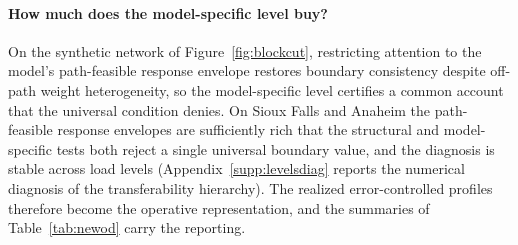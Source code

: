 \paragraph{How much does the model-specific level buy?}\label{sec:levelsdiag}
On the synthetic network of Figure~\ref{fig:blockcut}, restricting
attention to the model's path-feasible response envelope restores
boundary consistency despite off-path weight heterogeneity, so the
model-specific level certifies a common account that the universal
condition denies. On Sioux Falls and Anaheim the path-feasible
response envelopes are sufficiently rich that the structural and
model-specific tests both reject a single universal boundary value,
and the diagnosis is stable across load levels
(Appendix~\ref{supp:levelsdiag} reports the numerical diagnosis of the
transferability hierarchy). The realized error-controlled profiles
therefore become the operative representation, and the summaries of
Table~\ref{tab:newod} carry the reporting.
